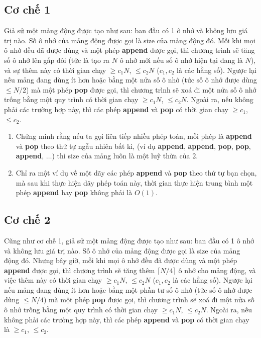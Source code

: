 \documentclass{article}
\begin{document}
\subsection{Cơ chế 1}
Giả sử một mảng động được tạo như sau: ban đầu có 1 ô nhớ và không lưu giá trị nào. Số ô nhớ của mảng động được gọi là size của mảng động đó. Mỗi khi mọi ô nhớ đều đã được dùng và một phép \textbf{append} được gọi, thì chương trình sẽ tăng số ô nhớ lên gấp đôi (tức là tạo ra $N$ ô nhớ mới nếu số ô nhớ hiện tại đang là $N$), và sự thêm này có thời gian chạy $\geq c_1 N$, $\leq c_2 N$ ($c_1, c_2$ là các hằng số). Ngược lại nếu mảng đang dùng ít hơn hoặc bằng một nửa số ô nhớ (tức số ô nhớ được dùng $\leq N/2$) mà một phép \textbf{pop} được gọi, thì chương trình sẽ xoá đi một nửa số ô nhớ trống bằng một quy trình có thời gian chạy $\geq c_1 N$, $\leq c_2 N$. Ngoài ra, nếu không phải các trường hợp này, thì các phép \textbf{append} và \textbf{pop} có thời gian chạy $\geq c_1$, $\leq c_2$. 
\begin{em}
    \begin{enumerate}
        \item Chứng minh rằng nếu ta gọi liên tiếp nhiều phép toán, mỗi phép là \textbf{append} và \textbf{pop} theo thứ tự ngẫu nhiên bất kì, (ví dụ \textbf{append}, \textbf{append}, \textbf{pop}, \textbf{pop}, \textbf{append}, $\ldots$) thì size của mảng luôn là một luỹ thừa của 2.
        
        \item Chỉ ra một ví dụ về một dãy các phép \textbf{append} và \textbf{pop} theo thứ tự bạn chọn, mà sau khi thực hiện dãy phép toán này, thời gian thực hiện trung bình một phép \textbf{append} hay \textbf{pop} không phải là $O(1)$.
    \end{enumerate}
\end{em}

\subsection{Cơ chế 2}
Cũng như cơ chế 1, giả sử một mảng động được tạo như sau: ban đầu có 1 ô nhớ và không lưu giá trị nào. Số ô nhớ của mảng động được gọi là size của mảng động đó. Nhưng bây giờ, mỗi khi mọi ô nhớ đều đã được dùng và một phép \textbf{append} được gọi, thì chương trình sẽ tăng thêm $\lceil N/4 \rceil$ ô nhớ cho mảng động, và việc thêm này có thời gian chạy $\geq c_1 N$, $\leq c_2 N$ ($c_1, c_2$ là các hằng số). Ngược lại nếu mảng đang dùng ít hơn hoặc bằng một phần tư số ô nhớ (tức số ô nhớ được dùng $\leq N/4$) mà một phép \textbf{pop} được gọi, thì chương trình sẽ xoá đi một nửa số ô nhớ trống bằng một quy trình có thời gian chạy $\geq c_1 N$, $\leq c_2 N$. Ngoài ra, nếu không phải các trường hợp này, thì các phép \textbf{append} và \textbf{pop} có thời gian chạy là  $\geq c_1$, $\leq c_2$. \\
\end{document}
